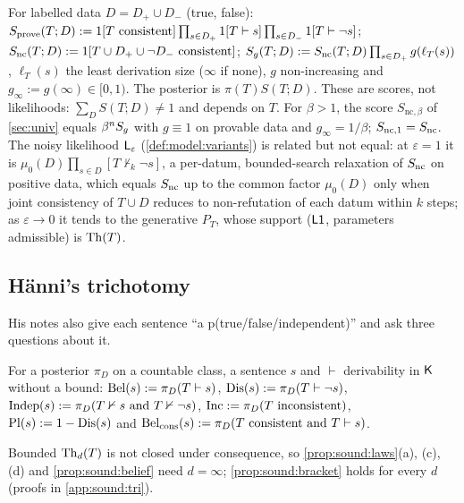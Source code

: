 \begin{definition}\label{def:model:scores}
For labelled data $D=D_+\cup D_-$ (true, false):
$S_{\mathrm{prove}}(T;D):=1[T\text{ consistent}]\prod_{s\in D_+}1[T\vdash s]\prod_{s\in D_-}1[T\vdash\neg s]$;
$S_{\mathrm{nc}}(T;D):=1[T\cup D_+\cup\neg D_-\text{ consistent}]$;
$S_{g}(T;D):=S_{\mathrm{nc}}(T;D)\prod_{s\in D_+}g(\ell_T(s))$, $\ell_T(s)$ the least derivation size ($\infty$ if none), $g$ non-increasing and $g_\infty:=g(\infty)\in[0,1)$. The posterior is $\pi(T)S(T;D)$. These are scores, not likelihoods: $\sum_DS(T;D)\ne1$ and depends on $T$. For $\beta>1$, the score $S_{\mathrm{nc},\beta}$ of \cref{sec:univ} equals $\beta^nS_{g}$ with $g\equiv1$ on provable data and $g_\infty=1/\beta$; $S_{\mathrm{nc},1}=S_{\mathrm{nc}}$. The noisy likelihood $\mathsf{L}_{\varepsilon}$ (\cref{def:model:variants}) is related but not equal: at $\varepsilon=1$ it is $\mu_0(D)\prod_{s\in D}[T\nvdash_k\neg s]$, a per-datum, bounded-search relaxation of $S_{\mathrm{nc}}$ on positive data, which equals $S_{\mathrm{nc}}$ up to the common factor $\mu_0(D)$ only when joint consistency of $T\cup D$ reduces to non-refutation of each datum within $k$ steps; as $\varepsilon\to0$ it tends to the generative $P_T$, whose support ($\mathord{\mathsf{L1}}$, parameters admissible) is $\mathrm{Th}(T)$.
\end{definition}

\subsection{H\"anni's trichotomy}\label{sec:sound:tri}

His notes also give each sentence ``a p(true/\allowbreak false/\allowbreak independent)'' and ask three questions about it.

\begin{definition}\label{def:sound:tri}
For a posterior $\pi_D$ on a countable class, a sentence $s$ and $\vdash$ derivability in $\mathsf{K}$ without a bound: $\mathrm{Bel}(s):=\pi_D(T\vdash s)$, $\mathrm{Dis}(s):=\pi_D(T\vdash\neg s)$, $\mathrm{Indep}(s):=\pi_D(T\nvdash s\text{ and }T\nvdash\neg s)$, $\mathrm{Inc}:=\pi_D(T\text{ inconsistent})$, $\mathrm{Pl}(s):=1-\mathrm{Dis}(s)$ and $\mathrm{Bel}_{\mathrm{cons}}(s):=\pi_D(T\text{ consistent and }T\vdash s)$.
\end{definition}

\noindent Bounded $\mathrm{Th}_d(T)$ is not closed under consequence, so \cref{prop:sound:laws}(a), (c), (d) and \cref{prop:sound:belief} need $d=\infty$; \cref{prop:sound:bracket} holds for every $d$ (proofs in \cref{app:sound:tri}).

